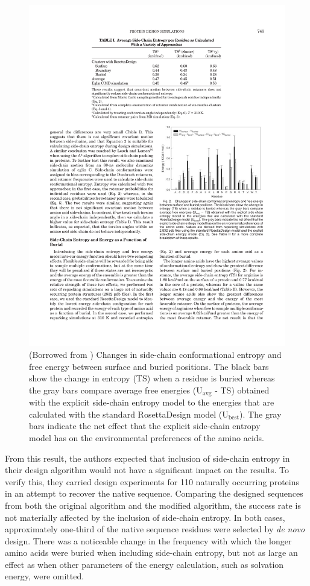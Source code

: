 \begin{figure}[ht]
	\center
	\includegraphics{surface_vs_buried}
	\caption{(Borrowed from \cite{Hu:2006p68}) Changes in side-chain conformational entropy and free energy between surface and buried positions. The black bars show the change in entropy (TS) when a residue is buried whereas the gray bars compare average free energies ($\mathrm{U_{avg}}$ - TS) obtained with the explicit side-chain entropy model to the energies that are calculated with the standard RosettaDesign model ($\mathrm{U_{best}}$). The gray bars indicate the net effect that the explicit side-chain entropy model has on the environmental preferences of the amino acids.}
	\label{fig:surface_vs_buried}
\end{figure}

From this result, the authors expected that inclusion of side-chain entropy in their design algorithm would not have a significant impact on the results. To verify this, they carried design experiments for 110 naturally occurring proteins in an attempt to recover the native sequence. Comparing the designed sequences from both the original algorithm and the modified algorithm, the success rate is not materially affected by the inclusion of side-chain entropy. In both cases, approximately one-third of the native sequence residues were selected by \emph{de novo} design. There was a noticeable change in the frequency with which the longer amino acids were buried when including side-chain entropy, but not as large an effect as when other parameters of the energy calculation, such as solvation energy, were omitted.

